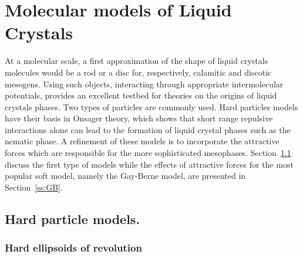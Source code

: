 \section{Molecular models of Liquid Crystals}

At a molecular scale, a first approximation of the shape of liquid crystals molecules 
would be a rod or a disc for, respectively, calamitic and discotic mesogens. 
Using such objects, interacting through appropriate intermolecular
potentials, provides an excellent testbed for theories on the origins of liquid crystals
phases. Two types of particles are commonly used. Hard particles models have their basis in 
Onsager theory, which shows that short range repulsive interactions alone can lead to the formation
of liquid crystal phases such as the nematic phase. A refinement of these models is to
incorporate the attractive forces which are responsible for the more sophisticated mesophases.
Section~\ref{ss:HP} discuss the first type of models while the effects of attractive forces
for the most popular soft model, namely the Gay-Berne model, are presented in Section~\ref{ss:GB}.

\subsection{Hard particle models.}
\label{ss:HP}

\subsubsection{Hard ellipsoids of revolution}

